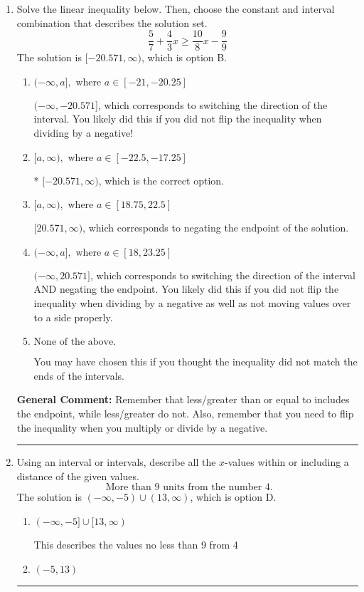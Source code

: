 \documentclass{extbook}[14pt]
\newcommand{\litem}[1]{\item #1

\rule{\textwidth}{0.4pt}}
\begin{document}
\begin{enumerate}\litem{
Solve the linear inequality below. Then, choose the constant and interval combination that describes the solution set.
\[ \frac{5}{7} + \frac{4}{3} x \geq \frac{10}{8} x - \frac{9}{9} \]The solution is \( [-20.571, \infty) \), which is option B.\begin{enumerate}[label=\Alph*.]
\item \( (-\infty, a], \text{ where } a \in [-21, -20.25] \)

 $(-\infty, -20.571]$, which corresponds to switching the direction of the interval. You likely did this if you did not flip the inequality when dividing by a negative!
\item \( [a, \infty), \text{ where } a \in [-22.5, -17.25] \)

* $[-20.571, \infty)$, which is the correct option.
\item \( [a, \infty), \text{ where } a \in [18.75, 22.5] \)

 $[20.571, \infty)$, which corresponds to negating the endpoint of the solution.
\item \( (-\infty, a], \text{ where } a \in [18, 23.25] \)

 $(-\infty, 20.571]$, which corresponds to switching the direction of the interval AND negating the endpoint. You likely did this if you did not flip the inequality when dividing by a negative as well as not moving values over to a side properly.
\item \( \text{None of the above}. \)

You may have chosen this if you thought the inequality did not match the ends of the intervals.
\end{enumerate}

\textbf{General Comment:} Remember that less/greater than or equal to includes the endpoint, while less/greater do not. Also, remember that you need to flip the inequality when you multiply or divide by a negative.
}
\litem{
Using an interval or intervals, describe all the $x$-values within or including a distance of the given values.
\[ \text{ More than } 9 \text{ units from the number } 4. \]The solution is \( (-\infty, -5) \cup (13, \infty) \), which is option D.\begin{enumerate}[label=\Alph*.]
\item \( (-\infty, -5] \cup [13, \infty) \)

This describes the values no less than 9 from 4
\item \( (-5, 13) \)


\end{enumerate}}
\end{enumerate}
\end{document}
